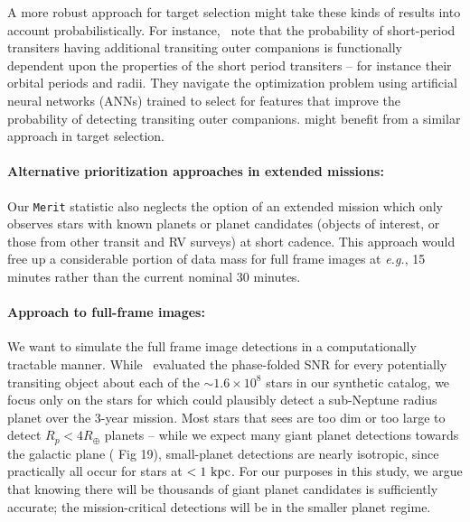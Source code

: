 A more robust approach for \tesss target selection might take these kinds of results into account probabilistically.
For instance,~\protect\citet{kipping_transit_2016} note that the probability of short-period transiters having additional transiting outer companions is functionally dependent upon the properties of the short period transiters -- for instance their orbital periods and radii.
They navigate the optimization problem using artificial neural networks (ANNs) trained to select for features that improve the probability of detecting transiting outer companions.
\tess might benefit from a similar approach in target selection.

\paragraph{Alternative prioritization approaches in extended missions:}
Our \texttt{Merit} statistic also neglects the option of an extended mission which only observes stars with known planets or planet candidates (\tesss objects of interest, or those from other transit and RV surveys) at short cadence.
This approach would free up a considerable portion of \tesss data mass for full frame images at \textit{e.g.}, 15 minutes rather than the current nominal 30 minutes.

\paragraph{Approach to full-frame images:}
\label{sec:FFI_simulation}
We want to simulate the full frame image detections in a computationally tractable manner.
While~ evaluated the phase-folded SNR for every potentially transiting object about each of the $\sim 1.6\times10^8$ stars in our synthetic catalog, we focus only on the stars for which \tess could plausibly detect a sub-Neptune radius planet over the 3-year mission.
Most stars that \tess sees are too dim or too large to detect $R_p<4R_\oplus$ planets -- while we expect many giant planet detections towards the galactic plane ( Fig 19), small-planet detections are nearly isotropic, since practically all occur for stars at $<1\rm\ kpc$.
For our purposes in this study, we argue that knowing there will be thousands of giant planet candidates is sufficiently accurate; the mission-critical detections will be in the smaller planet regime.

